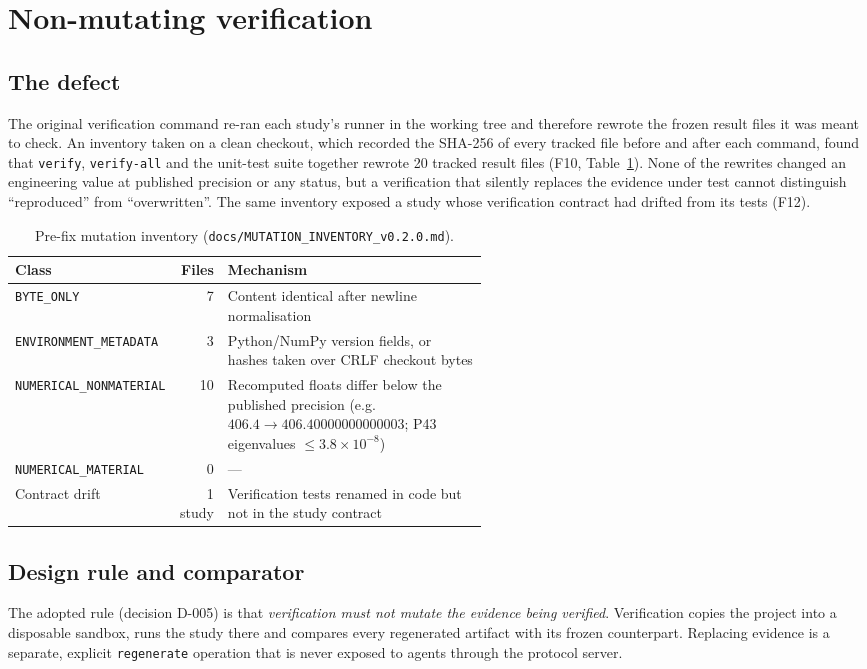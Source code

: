\section{Non-mutating verification}
\label{sec:nonmutation}

\subsection{The defect}
The original verification command re-ran each study's runner in the working tree and therefore rewrote the frozen result files it was meant to check. An inventory taken on a clean checkout, which recorded the SHA-256 of every tracked file before and after each command, found that \texttt{verify}, \texttt{verify-all} and the unit-test suite together rewrote 20 tracked result files (F10, Table~\ref{tab:mutation}). None of the rewrites changed an engineering value at published precision or any status, but a verification that silently replaces the evidence under test cannot distinguish ``reproduced'' from ``overwritten''. The same inventory exposed a study whose verification contract had drifted from its tests (F12).

\begin{table}[htbp]
\centering
\caption{Pre-fix mutation inventory (\texttt{docs/MUTATION\_INVENTORY\_v0.2.0.md}).}
\label{tab:mutation}
\footnotesize\setlength{\tabcolsep}{3pt}
\begin{tabular}{lr>{\raggedright\arraybackslash}p{0.55\linewidth}}
\toprule
Class & Files & Mechanism \\
\midrule
\texttt{BYTE\_ONLY} & 7 & Content identical after newline normalisation \\
\texttt{ENVIRONMENT\_METADATA} & 3 & Python/NumPy version fields, or hashes taken over CRLF checkout bytes \\
\texttt{NUMERICAL\_NONMATERIAL} & 10 & Recomputed floats differ below the published precision (e.g.\ $406.4 \to 406.40000000000003$; P43 eigenvalues $\le 3.8\times10^{-8}$) \\
\texttt{NUMERICAL\_MATERIAL} & 0 & --- \\
Contract drift & 1 study & Verification tests renamed in code but not in the study contract \\
\bottomrule
\end{tabular}
\end{table}

\subsection{Design rule and comparator}
The adopted rule (decision D-005) is that \emph{verification must not mutate the evidence being verified}. Verification copies the project into a disposable sandbox, runs the study there and compares every regenerated artifact with its frozen counterpart. Replacing evidence is a separate, explicit \texttt{regenerate} operation that is never exposed to agents through the protocol server.

